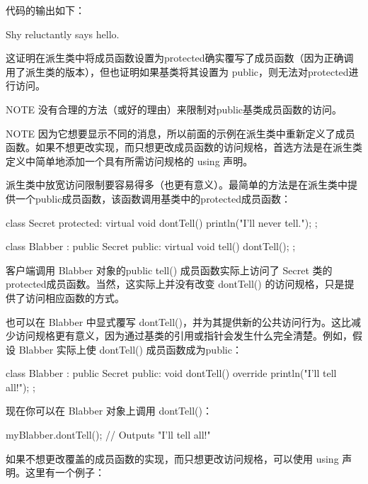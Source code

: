 代码的输出如下：

\begin{shell}
Shy reluctantly says hello.
\end{shell}

这证明在派生类中将成员函数设置为protected确实覆写了成员函数（因为正确调用了派生类的版本），但也证明如果基类将其设置为 public，则无法对protected进行访问。

\begin{myNotic}{NOTE}
没有合理的方法（或好的理由）来限制对public基类成员函数的访问。
\end{myNotic}

\begin{myNotic}{NOTE}
因为它想要显示不同的消息，所以前面的示例在派生类中重新定义了成员函数。如果不想更改实现，而只想更改成员函数的访问规格，首选方法是在派生类定义中简单地添加一个具有所需访问规格的 using 声明。
\end{myNotic}

派生类中放宽访问限制要容易得多（也更有意义）。最简单的方法是在派生类中提供一个public成员函数，该函数调用基类中的protected成员函数：

\begin{cpp}
class Secret
{
    protected:
        virtual void dontTell() { println("I'll never tell."); }
};

class Blabber : public Secret
{
    public:
        virtual void tell() { dontTell(); }
};
\end{cpp}

客户端调用 Blabber 对象的public tell() 成员函数实际上访问了 Secret 类的protected成员函数。当然，这实际上并没有改变 dontTell() 的访问规格，只是提供了访问相应函数的方式。

也可以在 Blabber 中显式覆写 dontTell()，并为其提供新的公共访问行为。这比减少访问规格更有意义，因为通过基类的引用或指针会发生什么完全清楚。例如，假设 Blabber 实际上使 dontTell() 成员函数成为public：

\begin{cpp}
class Blabber : public Secret
{
    public:
        void dontTell() override { println("I'll tell all!"); }
};
\end{cpp}

现在你可以在 Blabber 对象上调用 dontTell()：

\begin{cpp}
myBlabber.dontTell(); // Outputs "I'll tell all!"
\end{cpp}

如果不想更改覆盖的成员函数的实现，而只想更改访问规格，可以使用 using 声明。这里有一个例子：

